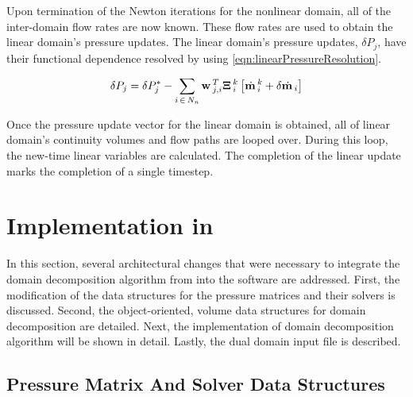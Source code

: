 Upon termination of the Newton iterations for the nonlinear domain, all of the inter-domain flow rates are now known.
These flow rates are used to obtain the linear domain's pressure updates.
The linear domain's pressure updates, $\delta P_{j}$, have their functional dependence resolved by using \eqref{eqn:linearPressureResolution}.

\begin{equation}
\label{eqn:linearPressureResolution}
\delta P_{j} = \delta P^{*}_{j} - \sum_{i\,\in \, N_{n}} \vec{w}_{j,i}^{T} \vec{\Xi}^{k}_{i} \left[ \momVec{}^{k}_{i} + \delta \momVec{}_{i}\right]
\end{equation}

Once the pressure update vector for the linear domain is obtained, all of linear domain's continuity volumes and flow paths are looped over.
During this loop, the new-time linear variables are calculated.
The completion of the linear update marks the completion of a single timestep.

\section{Implementation in \cobra{}}
\label{sec:dd_algo}

In this section, several architectural changes that were necessary to integrate the domain decomposition algorithm from  into the \cobra{} software are addressed.
First, the modification of the data structures for the pressure matrices and their solvers is discussed.
Second, the object-oriented, volume data structures for domain decomposition are detailed.
Next, the implementation of domain decomposition algorithm will be shown in detail.
Lastly, the dual domain input file is described.

\subsection{Pressure Matrix And Solver Data Structures}
\label{subsect:domDecompSolverStructs}

